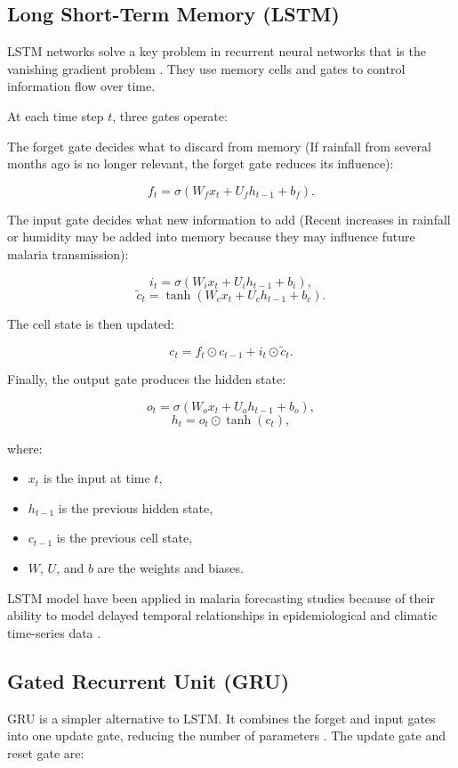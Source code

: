 \subsection{Long Short-Term Memory (LSTM)}

LSTM networks solve a key problem in recurrent neural networks that is the vanishing gradient problem \cite{Okundalaye2025Climate-based}. They use memory cells and gates to control information flow over time.

At each time step \(t\), three gates operate:

The forget gate decides what to discard from memory (If rainfall from several months
ago is no longer relevant, the forget gate reduces its influence):

\[
f_t = \sigma(W_f x_t + U_f h_{t-1} + b_f).
\]

The input gate decides what new information to add (Recent increases in rainfall or
humidity may be added into memory because they may influence future
malaria transmission):

\[
i_t = \sigma(W_i x_t + U_i h_{t-1} + b_i),
\]
\[
\tilde{c}_t = \tanh(W_c x_t + U_c h_{t-1} + b_c).
\]

The cell state is then updated:

\[
c_t = f_t \odot c_{t-1} + i_t \odot \tilde{c}_t.
\]

Finally, the output gate produces the hidden state:

\[
o_t = \sigma(W_o x_t + U_o h_{t-1} + b_o),
\]
\[
h_t = o_t \odot \tanh(c_t),
\]

where:
\begin{itemize}
	\item $x_t$ is the input at time $t$,
	\item $h_{t-1}$ is the previous hidden state,
	\item $c_{t-1}$ is the previous cell state,
	\item $W$, $U$, and $b$ are the weights and biases.
\end{itemize}
LSTM model have been applied in malaria forecasting studies because of their ability to model delayed temporal relationships in epidemiological and climatic time-series data \cite{Okundalaye2025Climate-based}.

\subsection{Gated Recurrent Unit (GRU)}

GRU is a simpler alternative to LSTM. It combines the forget and input gates into one update gate, reducing the number of parameters \cite{Goodfellow-et-al-2016} . The update gate and reset gate are:


